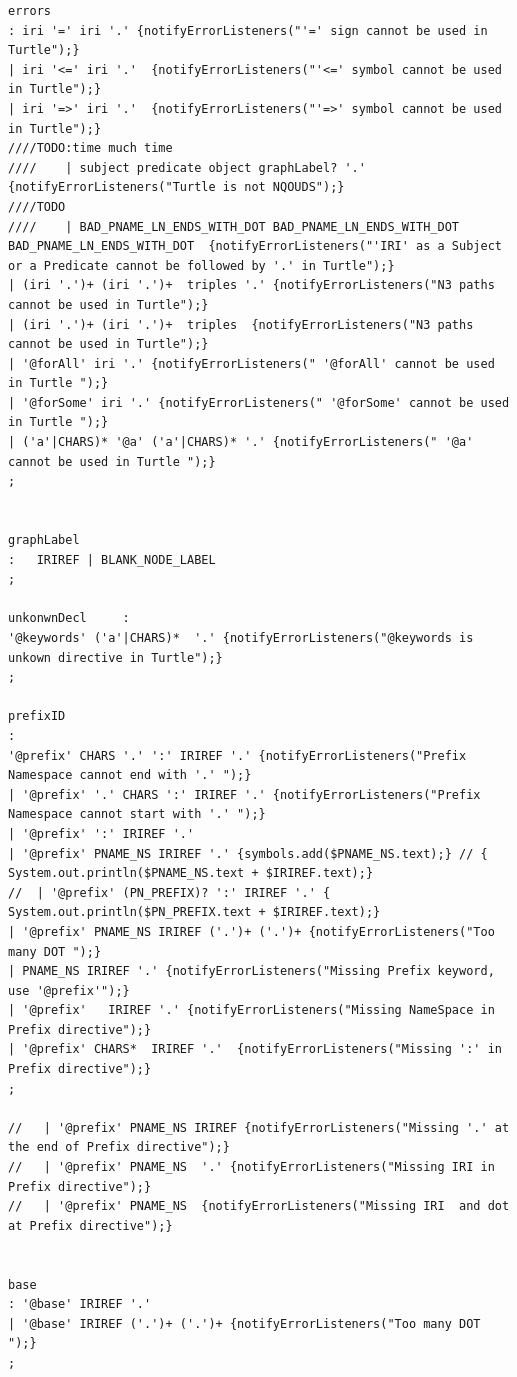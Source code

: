 \begin{appendices}
\begin{lstlisting}
errors	
: iri '=' iri '.' {notifyErrorListeners("'=' sign cannot be used in Turtle");}
| iri '<=' iri '.'  {notifyErrorListeners("'<=' symbol cannot be used in Turtle");}
| iri '=>' iri '.'  {notifyErrorListeners("'=>' symbol cannot be used in Turtle");}
////TODO:time much time
////    | subject predicate object graphLabel? '.' {notifyErrorListeners("Turtle is not NQOUDS");}
////TODO
//// 	| BAD_PNAME_LN_ENDS_WITH_DOT BAD_PNAME_LN_ENDS_WITH_DOT  BAD_PNAME_LN_ENDS_WITH_DOT  {notifyErrorListeners("'IRI' as a Subject or a Predicate cannot be followed by '.' in Turtle");}
| (iri '.')+ (iri '.')+  triples '.' {notifyErrorListeners("N3 paths cannot be used in Turtle");}
| (iri '.')+ (iri '.')+  triples  {notifyErrorListeners("N3 paths cannot be used in Turtle");}
| '@forAll' iri '.' {notifyErrorListeners(" '@forAll' cannot be used in Turtle ");}
| '@forSome' iri '.' {notifyErrorListeners(" '@forSome' cannot be used in Turtle ");}
| ('a'|CHARS)* '@a' ('a'|CHARS)* '.' {notifyErrorListeners(" '@a' cannot be used in Turtle ");}
;


graphLabel
: 	IRIREF | BLANK_NODE_LABEL
;

unkonwnDecl 	:
'@keywords' ('a'|CHARS)*  '.' {notifyErrorListeners("@keywords is unkown directive in Turtle");}
;	

prefixID
:
'@prefix' CHARS '.' ':' IRIREF '.' {notifyErrorListeners("Prefix Namespace cannot end with '.' ");}
| '@prefix' '.' CHARS ':' IRIREF '.' {notifyErrorListeners("Prefix Namespace cannot start with '.' ");}
| '@prefix' ':' IRIREF '.' 
| '@prefix' PNAME_NS IRIREF '.' {symbols.add($PNAME_NS.text);} // { System.out.println($PNAME_NS.text + $IRIREF.text);} 
//  | '@prefix' (PN_PREFIX)? ':' IRIREF '.' { System.out.println($PN_PREFIX.text + $IRIREF.text);} 
| '@prefix' PNAME_NS IRIREF ('.')+ ('.')+ {notifyErrorListeners("Too many DOT ");}
| PNAME_NS IRIREF '.' {notifyErrorListeners("Missing Prefix keyword, use '@prefix'");}
| '@prefix'   IRIREF '.' {notifyErrorListeners("Missing NameSpace in Prefix directive");}
| '@prefix' CHARS*  IRIREF '.'  {notifyErrorListeners("Missing ':' in Prefix directive");}
;

//   | '@prefix' PNAME_NS IRIREF {notifyErrorListeners("Missing '.' at the end of Prefix directive");}
//   | '@prefix' PNAME_NS  '.' {notifyErrorListeners("Missing IRI in Prefix directive");}
//   | '@prefix' PNAME_NS  {notifyErrorListeners("Missing IRI  and dot at Prefix directive");}


base
: '@base' IRIREF '.'
| '@base' IRIREF ('.')+ ('.')+ {notifyErrorListeners("Too many DOT ");}
;


\end{lstlisting}
\end{appendices}

